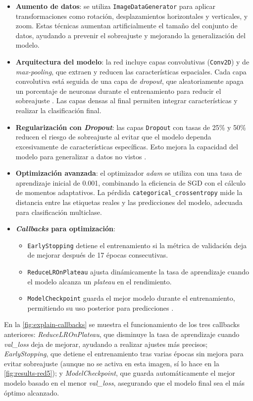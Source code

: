 \begin{itemize}
	\item \textbf{Aumento de datos}: se utiliza \texttt{ImageDataGenerator} para aplicar transformaciones como rotación, desplazamientos horizontales y verticales, y zoom. Estas técnicas aumentan artificialmente el tamaño del conjunto de datos, ayudando a prevenir el sobreajuste y mejorando la generalización del modelo.
	\item \textbf{Arquitectura del modelo}: la red incluye capas convolutivas (\texttt{Conv2D}) y de \textit{max-pooling}, que extraen y reducen las características espaciales. Cada capa convolutiva está seguida de una capa de \textit{dropout}, que aleatoriamente apaga un porcentaje de neuronas durante el entrenamiento para reducir el sobreajuste \parencite{srivastava2014dropout}. Las capas densas al final permiten integrar características y realizar la clasificación final.
	\item \textbf{Regularización con \textit{Dropout}}: las capas \texttt{Dropout} con tasas de 25\% y 50\% reducen el riesgo de sobreajuste al evitar que el modelo dependa excesivamente de características específicas. Esto mejora la capacidad del modelo para generalizar a datos no vistos \parencite{srivastava2014dropout}.
	\item \textbf{Optimización avanzada}: el optimizador \textit{adam} se utiliza con una tasa de aprendizaje inicial de 0.001, combinando la eficiencia de SGD con el cálculo de momentos adaptativos. La pérdida \texttt{categorical\_crossentropy} mide la distancia entre las etiquetas reales y las predicciones del modelo, adecuada para clasificación multiclase.
	
	\item \textbf{\textit{Callbacks} para optimización}: 
	\begin{itemize}
		\item \texttt{EarlyStopping} detiene el entrenamiento si la métrica de validación deja de mejorar después de 17 épocas consecutivas.
		\item \texttt{ReduceLROnPlateau} ajusta dinámicamente la tasa de aprendizaje cuando el modelo alcanza un \textit{plateau} en el rendimiento.
		\item \texttt{ModelCheckpoint} guarda el mejor modelo durante el entrenamiento, permitiendo su uso posterior para predicciones \parencite{bengio2012practical}.
	\end{itemize}
\end{itemize}

En la \autoref{fig:explain-callbacks} se muestra el funcionamiento de los tres callbacks anteriores: \textit{ReduceLROnPlateau}, que disminuye la tasa de aprendizaje cuando \textit{val\_loss} deja de mejorar, ayudando a realizar ajustes más precisos; \textit{EarlyStopping}, que detiene el entrenamiento tras varias épocas sin mejora para evitar sobreajuste (aunque no se activa en esta imagen, sí lo hace en la \autoref{fig:results-red5}); y \textit{ModelCheckpoint}, que guarda automáticamente el mejor modelo basado en el menor \textit{val\_loss}, asegurando que el modelo final sea el más óptimo alcanzado.

